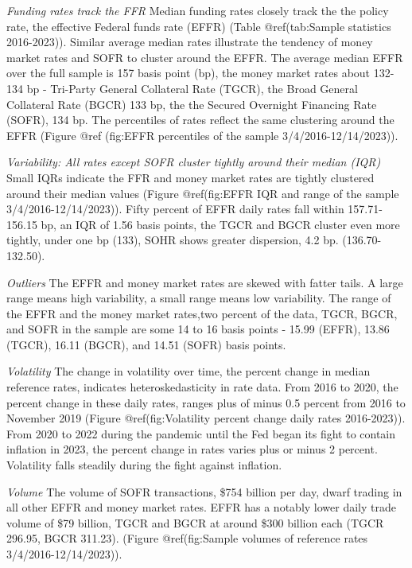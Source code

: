\documentclass[
]{article}
\begin{document}
\emph{Funding rates track the FFR}
Median funding rates closely track the the policy rate, the effective Federal funds rate (EFFR) (Table @ref(tab:Sample statistics 2016-2023)). Similar average median rates illustrate the tendency of money market rates and SOFR to cluster around the EFFR. The average median EFFR over the full sample is 157 basis point (bp), the money market rates about 132-134 bp - Tri-Party General Collateral Rate (TGCR), the Broad General Collateral Rate (BGCR) 133 bp, the the Secured Overnight Financing Rate (SOFR), 134 bp. The percentiles of rates reflect the same clustering around the EFFR (Figure @ref (fig:EFFR percentiles of the sample 3/4/2016-12/14/2023)).

\emph{Variability: All rates except SOFR cluster tightly around their median (IQR)}
Small IQRs indicate the FFR and money market rates are tightly clustered around their median values (Figure @ref(fig:EFFR IQR and range of the sample 3/4/2016-12/14/2023)). Fifty percent of EFFR daily rates fall within 157.71-156.15 bp, an IQR of 1.56 basis points, the TGCR and BGCR cluster even more tightly, under one bp (133), SOHR shows greater dispersion, 4.2 bp. (136.70-132.50).

\emph{Outliers}
The EFFR and money market rates are skewed with fatter tails. A large range means high variability, a small range means low variability. The range of the EFFR and the money market rates,two percent of the data, TGCR, BGCR, and SOFR in the sample are some 14 to 16 basis points - 15.99 (EFFR), 13.86 (TGCR), 16.11 (BGCR), and 14.51 (SOFR) basis points.

\emph{Volatility}
The change in volatility over time, the percent change in median reference rates, indicates heteroskedasticity in rate data. From 2016 to 2020, the percent change in these daily rates, ranges plus of minus 0.5 percent from 2016 to November 2019 (Figure @ref(fig:Volatility percent change daily rates 2016-2023)). From 2020 to 2022 during the pandemic until the Fed began its fight to contain inflation in 2023, the percent change in rates varies plus or minus 2 percent. Volatility falls steadily during the fight against inflation.

\emph{Volume}
The volume of SOFR transactions, \$754 billion per day, dwarf trading in all other EFFR and money market rates. EFFR has a notably lower daily trade volume of \$79 billion, TGCR and BGCR at around \$300 billion each (TGCR 296.95, BGCR 311.23). (Figure @ref(fig:Sample volumes of reference rates 3/4/2016-12/14/2023)).
\end{document}
